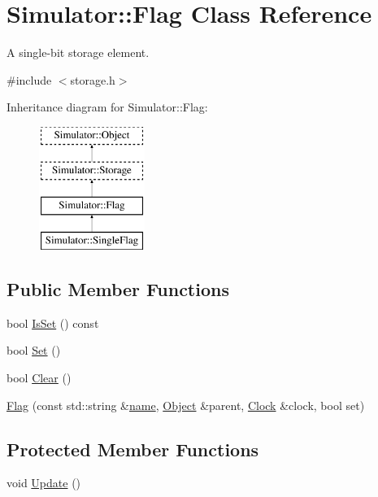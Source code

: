 \hypertarget{class_simulator_1_1_flag}{\section{Simulator\+:\+:Flag Class Reference}
\label{class_simulator_1_1_flag}
}


A single-\/bit storage element.  




{\ttfamily \#include $<$storage.\+h$>$}

Inheritance diagram for Simulator\+:\+:Flag\+:\begin{figure}[H]
\begin{center}
\leavevmode
\includegraphics[height=4.000000cm]{class_simulator_1_1_flag}
\end{center}
\end{figure}
\subsection*{Public Member Functions}
\begin{DoxyCompactItemize}
\item 
bool \hyperlink{class_simulator_1_1_flag_a51c8be3e44d72d11f733d2c90d70159f}{Is\+Set} () const 
\item 
bool \hyperlink{class_simulator_1_1_flag_a86125744ef8bff9a985413d093791aee}{Set} ()
\item 
bool \hyperlink{class_simulator_1_1_flag_a3972501a9392a9a08812a08b1c3a802d}{Clear} ()
\item 
\hyperlink{class_simulator_1_1_flag_a6f0399913e7ca717817b5adb00974ffd}{Flag} (const std\+::string \&\hyperlink{mtconf_8c_a8f8f80d37794cde9472343e4487ba3eb}{name}, \hyperlink{class_simulator_1_1_object}{Object} \&parent, \hyperlink{class_simulator_1_1_clock}{Clock} \&clock, bool set)
\end{DoxyCompactItemize}
\subsection*{Protected Member Functions}
\begin{DoxyCompactItemize}
\item 
void \hyperlink{class_simulator_1_1_flag_a3edbc0d4d4e12e0c425cbb05381c60ad}{Update} ()
\end{DoxyCompactItemize}
